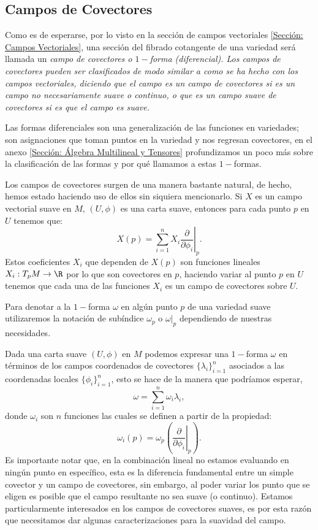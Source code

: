 \subsection{Campos de Covectores}\label{Subsección: Campos de Covectores}
Como es de esperarse, por lo visto en la sección de campos vectoriales \ref{Sección: Campos Vectoriales}, una sección del fibrado cotangente de una variedad será llamada un \it{campo de covectores} o \it{$1-$forma (diferencial)}. Los campos de covectores pueden ser clasificados de modo similar a como se ha hecho con los campos vectoriales, diciendo que el campo es un \it{campo de covectores} si es un campo no necesariamente suave o continuo, o que es un \it{campo suave de covectores} si es que el campo es suave.

Las formas diferenciales son una generalización de las funciones en variedades; son asignaciones que toman puntos en la variedad y nos regresan covectores, en el anexo \ref{Sección: Álgebra Multilineal y Tensores} profundizamos un poco más sobre la clasificación de las formas y por qué llamamos a estas $1-$formas.

Los campos de covectores surgen de una manera bastante natural, de hecho, hemos estado haciendo uso de ellos sin siquiera mencionarlo. Si $X$ es un campo vectorial suave en $M$, $(U, \phi)$ es una carta suave, entonces para cada punto $p$ en $U$ tenemos que:
\[
	X(p) = \sum_{i=1}^{n} X_i \left. \frac{\partial}{\partial \phi_i} \right|_{p}.
\]
Estos coeficientes $X_i$ que dependen de $X(p)$ son funciones lineales $X_i: T_{p}M \to \R$ por lo que son covectores en $p$, haciendo variar al punto $p$ en $U$ tenemos que cada una de las funciones $X_i$ es un campo de covectores sobre $U$.

Para denotar a la $1-$forma $\omega$ en algún punto $p$ de una variedad suave utilizaremos la notación de subíndice $\omega_p$ o $\omega|_{p}$ dependiendo de nuestras necesidades.

Dada una carta suave $(U,\phi)$ en $M$ podemos expresar una $1-$forma $\omega$ en términos de los campos coordenados de covectores $\{\lambda_i\}_{i=1}^n$ asociados a las coordenadas locales $\{\phi_i\}_{i=1}^n$, esto se hace de la manera que podríamos esperar,
\[
	\omega = \sum_{i=1}^{n} \omega_i \lambda_i,
\]
donde $\omega_i$ son $n$ funciones las cuales se definen a partir de la propiedad:
\[
	\omega_i(p)
	=
	\omega_p \left(\left.
	\frac{\partial}{\partial \phi_i}
	\right|_{p}\right).
\]
Es importante notar que, en la combinación lineal no estamos evaluando en ningún punto en específico, esta es la diferencia fundamental entre un simple covector y un campo de covectores, sin embargo, al poder variar los punto que se eligen es posible que el campo resultante no sea suave (o continuo). Estamos particularmente interesados en los campos de covectores suaves, es por esta razón que necesitamos dar algunas caracterizaciones para la suavidad del campo.

